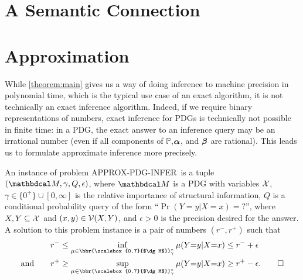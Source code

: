 

\section{A Semantic Connection}


\section{Approximation}

\def\ApproxPDGInfer{\textsf{APPROX-PDG-INFER}}
\def\ApproxPDGInc{\textsf{APPROX-CALC-INC}}
\def\ApproxInferUniq{\textsf{APPROX-INFER-CVX}}


While \cref{theorem:main} gives us a way of doing inference to machine precision in polynomial time, which is the typical use case of an exact algorithm, it is not technically an exact inference algorithm.
Indeed, if we require binary representations of numbers, exact inference for PDGs is technically not possible in finite time: in a PDG, the exact answer to an inference query may be an irrational number (even if all components of $\mathbb P$,$\boldsymbol\alpha$, and $\boldsymbol\beta$ are rational).
This leads us to formulate approximate inference more precisely.


\begin{defn}
    An instance of problem \ApproxPDGInfer\ 
    is a tuple $(\dg M, \gamma, Q, \epsilon)$, where
    $\dg M$ is a PDG with variables $\mathcal X$, $\gamma \in \{0^+\} \cup [0, \infty]$
    is the relative importance of structural information,
    $Q$ is a conditional probability query of the form
    ``$\Pr(Y{=}y|X{=}x) = ?$'', where $X,Y \subseteq \mathcal X$ and $(x,y) \in \mathcal V(X,Y)$,
    and $\epsilon > 0$ is the precision desired for the answer.
    A solution to this problem instance is a pair of numbers
    $(r^-, r^+)$
    such that
    \begin{align*}
        r^- &\le \inf_{\mu \in \bbr{\scalebox{0.7}{$\dg M$}}^*_\gamma} \mu(Y{=}y | X{=}x) \le r^- + \epsilon \\
        \text{and} \qquad
        r^+ &\ge \sup_{\mu \in \bbr{\scalebox{0.7}{$\dg M$}}^*_\gamma} \mu(Y{=}y | X{=}x) \ge r^+ - \epsilon. 
        \qedhere
    \end{align*}
\end{defn}

